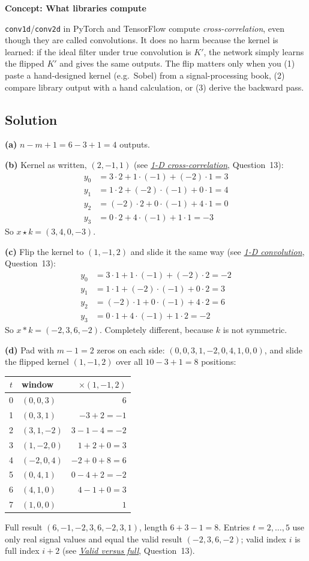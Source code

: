 \documentclass[12pt,a4paper]{article}
\newcommand{\concept}[2]{\par\medskip\phantomsection\label{#1}{\large\bfseries\color{blue!50!black} Concept: #2}\par}
\newcommand{\seeconcept}[3]{(see \hyperref[#1]{\textit{#2}}, Question~#3)}
\begin{document}
\concept{c:libcorr}{What libraries compute}
\texttt{conv1d}/\texttt{conv2d} in PyTorch and TensorFlow compute \emph{cross-correlation}, even though they are called convolutions. It does no harm because the kernel is learned: if the ideal filter under true convolution is $K'$, the network simply learns the flipped $K'$ and gives the same outputs. The flip matters only when you (1) paste a hand-designed kernel (e.g.\ Sobel) from a signal-processing book, (2) compare library output with a hand calculation, or (3) derive the backward pass.

\subsection*{Solution}
\textbf{(a)} $n-m+1=6-3+1=4$ outputs.

\textbf{(b)} Kernel as written, $(2,-1,1)$ \seeconcept{c:corr1d}{1-D cross-correlation}{13}:
\begin{align*}
y_0&=3\cdot2+1\cdot(-1)+(-2)\cdot1=3\\
y_1&=1\cdot2+(-2)\cdot(-1)+0\cdot1=4\\
y_2&=(-2)\cdot2+0\cdot(-1)+4\cdot1=0\\
y_3&=0\cdot2+4\cdot(-1)+1\cdot1=-3
\end{align*}
So $x\star k=(3,4,0,-3)$.

\textbf{(c)} Flip the kernel to $(1,-1,2)$ and slide it the same way \seeconcept{c:conv1d}{1-D convolution}{13}:
\begin{align*}
y_0&=3\cdot1+1\cdot(-1)+(-2)\cdot2=-2\\
y_1&=1\cdot1+(-2)\cdot(-1)+0\cdot2=3\\
y_2&=(-2)\cdot1+0\cdot(-1)+4\cdot2=6\\
y_3&=0\cdot1+4\cdot(-1)+1\cdot2=-2
\end{align*}
So $x*k=(-2,3,6,-2)$. Completely different, because $k$ is not symmetric.

\textbf{(d)} Pad with $m-1=2$ zeros on each side: $(0,0,3,1,-2,0,4,1,0,0)$, and slide the flipped kernel $(1,-1,2)$ over all $10-3+1=8$ positions:
\begin{center}
\begin{tabular}{@{}clr@{}}
\toprule
$t$ & window & $\times(1,-1,2)$\\
\midrule
0&$(0,0,3)$&$6$\\
1&$(0,3,1)$&$-3+2=-1$\\
2&$(3,1,-2)$&$3-1-4=-2$\\
3&$(1,-2,0)$&$1+2+0=3$\\
4&$(-2,0,4)$&$-2+0+8=6$\\
5&$(0,4,1)$&$0-4+2=-2$\\
6&$(4,1,0)$&$4-1+0=3$\\
7&$(1,0,0)$&$1$\\
\bottomrule
\end{tabular}
\end{center}
Full result $(6,-1,-2,3,6,-2,3,1)$, length $6+3-1=8$. Entries $t=2,\dots,5$ use only real signal values and equal the valid result $(-2,3,6,-2)$; valid index $i$ is full index $i+2$ \seeconcept{c:fullconv}{Valid versus full}{13}.
\end{document}

